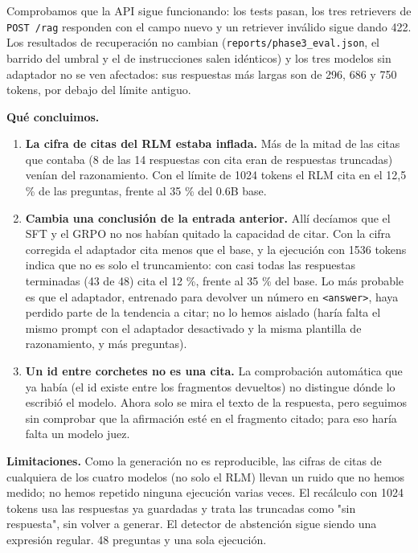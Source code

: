 Comprobamos que la API sigue funcionando: los tests pasan, los tres retrievers de
\texttt{POST /\allowbreak{}rag} responden con el campo nuevo y un retriever inválido sigue dando 422. Los resultados de
recuperación no cambian (\texttt{reports/\allowbreak{}phase3\_\allowbreak{}eval.json}, el barrido del umbral y el de instrucciones
salen idénticos) y los tres modelos sin adaptador no se ven afectados: sus respuestas más largas son
de 296, 686 y 750 tokens, por debajo del límite antiguo.

\textbf{Qué concluimos.}

\begin{enumerate}
\tightlist
\item
  \textbf{La cifra de citas del RLM estaba inflada.} Más de la mitad de las citas que contaba (8 de las 14
  respuestas con cita eran de respuestas truncadas) venían del razonamiento. Con el límite de 1024
  tokens el RLM cita en el 12,5 \% de las preguntas, frente al 35 \% del 0.6B base.
\item
  \textbf{Cambia una conclusión de la entrada anterior.} Allí decíamos que el SFT y el GRPO no nos habían
  quitado la capacidad de citar. Con la cifra corregida el adaptador cita menos que el base, y la
  ejecución con 1536 tokens indica que no es solo el truncamiento: con casi todas las respuestas
  terminadas (43 de 48) cita el 12 \%, frente al 35 \% del base. Lo más probable es que el adaptador,
  entrenado para devolver un número en \texttt{\textless{}answer\textgreater{}}, haya perdido parte de la tendencia a citar; no
  lo hemos aislado (haría falta el mismo prompt con el adaptador desactivado y la misma plantilla
  de razonamiento, y más preguntas).
\item
  \textbf{Un id entre corchetes no es una cita.} La comprobación automática que ya había (el id existe
  entre los fragmentos devueltos) no distingue dónde lo escribió el modelo. Ahora solo se mira el
  texto de la respuesta, pero seguimos sin comprobar que la afirmación esté en el fragmento
  citado; para eso haría falta un modelo juez.
\end{enumerate}

\textbf{Limitaciones.} Como la generación no es reproducible, las cifras de citas de cualquiera de los
cuatro modelos (no solo el RLM) llevan un ruido que no hemos medido; no hemos repetido ninguna
ejecución varias veces. El recálculo con 1024 tokens usa las respuestas ya guardadas y trata las truncadas
como "sin respuesta", sin volver a generar. El detector de abstención sigue siendo una expresión
regular. 48 preguntas y una sola ejecución.

